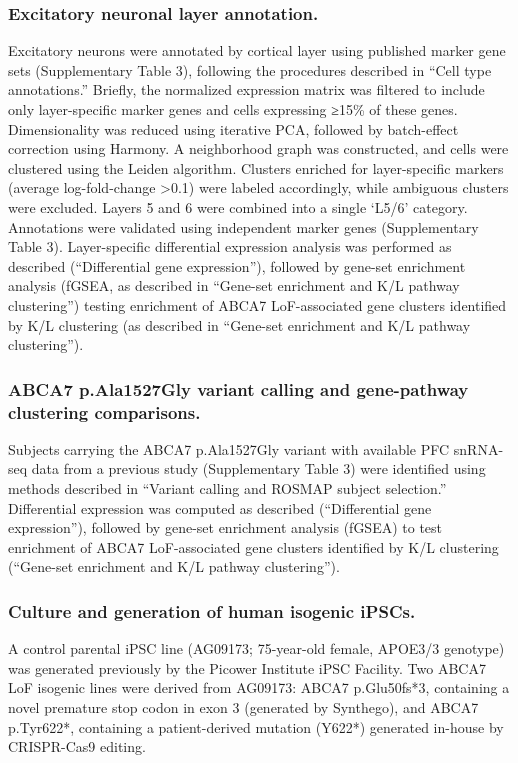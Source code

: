 \subsubsection{Excitatory neuronal layer annotation.}
Excitatory neurons were annotated by cortical layer using published marker gene sets\supercite{He2017-dq} (Supplementary Table 3), following the procedures described in “Cell type annotations.” Briefly, the normalized expression matrix was filtered to include only layer-specific marker genes and cells expressing ≥15\% of these genes. Dimensionality was reduced using iterative PCA, followed by batch-effect correction using Harmony. A neighborhood graph was constructed, and cells were clustered using the Leiden algorithm. Clusters enriched for layer-specific markers (average log-fold-change >0.1) were labeled accordingly, while ambiguous clusters were excluded. Layers 5 and 6 were combined into a single ‘L5/6’ category. Annotations were validated using independent marker genes\supercite{Maynard2021-mz} (Supplementary Table 3). Layer-specific differential expression analysis was performed as described (“Differential gene expression”), followed by gene-set enrichment analysis (fGSEA, as described in “Gene-set enrichment and K/L pathway clustering”) testing enrichment of ABCA7 LoF-associated gene clusters identified by K/L clustering (as described in “Gene-set enrichment and K/L pathway clustering”).

\subsubsection{ABCA7 p.Ala1527Gly variant calling and gene-pathway clustering comparisons.}
Subjects carrying the ABCA7 p.Ala1527Gly variant with available PFC snRNA-seq data from a previous study (Supplementary Table 3) were identified using methods described in “Variant calling and ROSMAP subject selection.” Differential expression was computed as described (“Differential gene expression”), followed by gene-set enrichment analysis (fGSEA) to test enrichment of ABCA7 LoF-associated gene clusters identified by K/L clustering (“Gene-set enrichment and K/L pathway clustering”).

\subsubsection{Culture and generation of human isogenic iPSCs.}
A control parental iPSC line (AG09173; 75-year-old female, APOE3/3 genotype) was generated previously by the Picower Institute iPSC Facility\supercite{Lin2018-ma}. Two ABCA7 LoF isogenic lines were derived from AG09173: ABCA7 p.Glu50fs*3, containing a novel premature stop codon in exon 3 (generated by Synthego), and ABCA7 p.Tyr622*, containing a patient-derived mutation (Y622*)\supercite{De_Roeck2019-bs} generated in-house by CRISPR-Cas9 editing.


